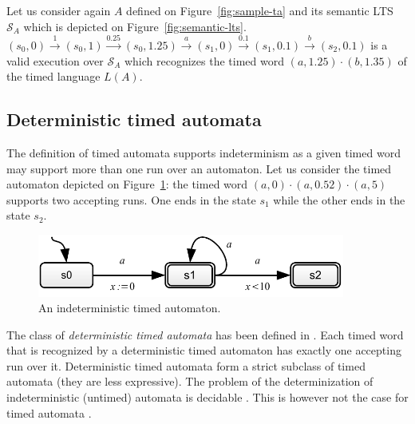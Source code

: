 Let us consider again $A$ defined on Figure~\ref{fig:sample-ta} and its semantic LTS $\mathcal{S}_A$ which is depicted on Figure~\ref{fig:semantic-lts}. $(s_0, 0) \stackrel{1}{\longrightarrow} (s_0, 1) \stackrel{0.25}{\longrightarrow} (s_0, 1.25) \stackrel{a}{\longrightarrow} (s_1, 0) \stackrel{0.1}{\longrightarrow} (s_1, 0.1) \stackrel{b}{\longrightarrow} (s_2, 0.1)$ is a valid execution over $\mathcal{S}_A$ which recognizes the timed word $(a, 1.25) \cdot (b, 1.35)$ of the timed language $L(A)$.


\subsection{Deterministic timed automata}


The definition of timed automata supports indeterminism as a given timed word may support more than one run over an automaton. Let us consider the timed automaton depicted on Figure~\ref{fig:indeterministic-ta}: the timed word $(a, 0) \cdot (a, 0.52) \cdot (a, 5)$ supports two accepting runs. One ends in the state $s_1$ while the other ends in the state $s_2$.\\

\begin{figure}[htbp]
    \centering
    \includegraphics[width=0.9\textwidth]{content/timed-automata/indeterministic-ta}
    \caption{An indeterministic timed automaton.}
    \label{fig:indeterministic-ta}
\end{figure}

The class of \emph{deterministic timed automata} has been defined in \cite{RADLD94}. Each timed word that is recognized by a deterministic timed automaton has exactly one accepting run over it. Deterministic timed automata form a strict subclass of timed automata (they are less expressive). The problem of the determinization of indeterministic (untimed) automata is decidable \cite{Hopcroft79}. This is however not the case for timed automata \cite{ST03}.

